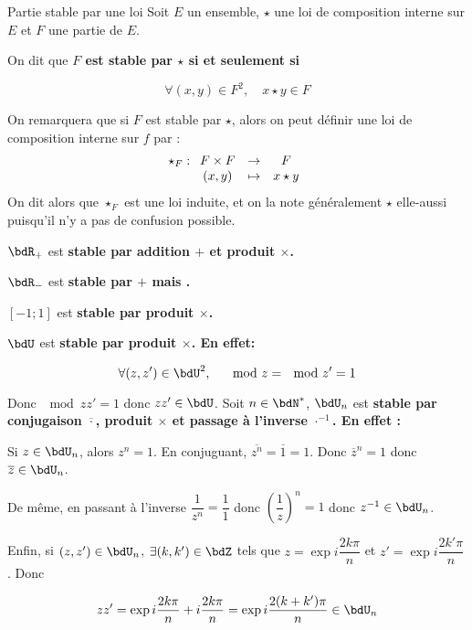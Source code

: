 \documentclass[a4paper,french,bookmarks]{article}
\begin{document}
\begin{definition}{Partie stable par une loi}{}
    Soit $E$ un ensemble, $\star$ une loi de composition interne sur $E$ et $F$ une partie de $E$.
    
    On dit que \bf{$F$ est stable par $\star$} si et seulement si 
    
    \[ \forall (x, y) \in F^2, \quad x \star y \in F\]
\end{definition}
On remarquera que si $F$ est stable par $\star$, alors on peut définir une loi de composition interne sur $f$ par :
\[ \star_F : \begin{array}[t]{ccc}
    F \times F &\to& F  \\
    (x, y) &\mapsto& x \star y 
\end{array}\]
On dit alors que $\star_F$ est une loi induite, et on la note généralement $\star$ elle-aussi puisqu'il n'y a pas de confusion possible.

\begin{example}{}{}
    \begin{enumerate}
        \ithand $\bdR_+$ est \bf{stable par addition $+$ et produit $\times$}.
            
        \ithand $\bdR_-$ est \bf{stable par $+$} mais \textit{}.
            
        \ithand $[-1; 1]$ est \bf{stable par produit $\times$}.
            
        \ithand $\bdU$ est \bf{stable par produit $\times$}. En effet:
            
        \[\forall (z, z') \in \bdU^2,\quad \mod{z} = \mod{z'} = 1\]
            
        Donc $\mod{zz'} = 1$ donc $zz' \in \bdU$.
        \ithand Soit $n \in \bdN^*$, $\bdU_n$ est \bf{stable par conjugaison $\overline{\cdot}$, produit $\times$ et passage à l'inverse $\cdot^{-1}$}. En effet :
        
        Si $z \in \bdU_n$, alors $z^n = 1$. En conjuguant, $\overline{z^n} = \overline{1} = 1$. Donc $\overline{z}^n = 1$ donc $\overline{z} \in \bdU_n$.
        
        De même, en passant à l'inverse $\dfrac{1}{z^n} = \dfrac{1}{1}$ donc $\left(\dfrac{1}{z}\right)^n = 1$ donc $z^{-1} \in \bdU_n$.
        
        Enfin, si $(z, z') \in \bdU_n$, $\exists (k, k') \in \bdZ$ tels que $z = \exp{i\dfrac{2k\pi}{n}}$ et $z' = \exp{i\dfrac{2k'\pi}{n}}$. Donc
        
        \[ zz' = \exp{i\dfrac{2k\pi}{n} + i\dfrac{2k\pi}{n}} = \exp{i\dfrac{2(k + k')\pi}{n}} \in \bdU_n\]
        
    \end{enumerate}
\end{example}
\end{document}
